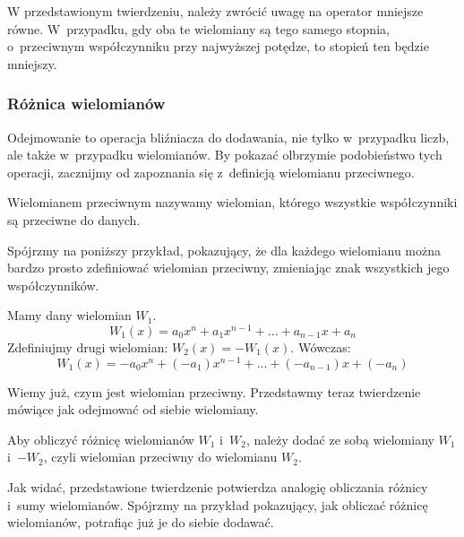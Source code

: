 W przedstawionym twierdzeniu, należy zwrócić uwagę na operator mniejsze równe. W~przypadku, gdy oba te wielomiany są tego samego stopnia, o~przeciwnym współczynniku przy najwyższej potędze, to stopień ten będzie mniejszy.

\subsubsection{Różnica wielomianów}

Odejmowanie to operacja bliźniacza do dodawania, nie tylko w~przypadku liczb, ale także w~przypadku wielomianów. By pokazać olbrzymie podobieństwo tych operacji, zacznijmy od zapoznania się z~definicją wielomianu przeciwnego.

\begin{definition}
	$ $\\
	Wielomianem przeciwnym nazywamy wielomian, którego wszystkie współczynniki są przeciwne do danych.
\end{definition}

Spójrzmy na poniższy przykład, pokazujący, że dla każdego wielomianu można bardzo prosto zdefiniować wielomian przeciwny, zmieniając znak wszystkich jego współczynników.

\begin{example}
	$ $\\
	Mamy dany wielomian $W_1$.
	\begin{equation*}
	W_1(x) = a_0x^n + a_1x^{n-1} + ... + a_{n-1}x + a_n
	\end{equation*}
	Zdefiniujmy drugi wielomian: $W_2(x) = -W_1(x)$. Wówczas:
	\begin{equation*}
	W_1(x) = -a_0x^n + (-a_1)x^{n-1} + ... + (-a_{n-1})x + (-a_n)
	\end{equation*}
\end{example}

Wiemy już, czym jest wielomian przeciwny. Przedstawmy teraz twierdzenie mówiące jak odejmować od siebie wielomiany.

\begin{theorem}
	$ $\\
	Aby obliczyć różnicę wielomianów $W_1$ i~$W_2$, należy dodać ze sobą wielomiany $W_1$ i~$-W_2$, czyli wielomian przeciwny do wielomianu $W_2$.
\end{theorem}

Jak widać, przedstawione twierdzenie potwierdza analogię obliczania różnicy i~sumy wielomianów. Spójrzmy na przykład pokazujący, jak obliczać różnicę wielomianów, potrafiąc już je do siebie dodawać.


